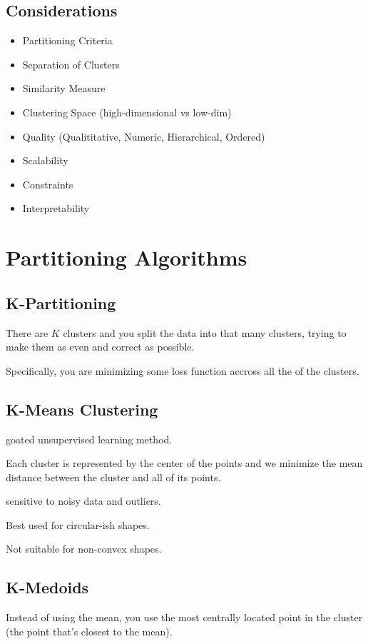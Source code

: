 \documentclass[fleqn]{report}
\begin{document}
\subsection{Considerations}
\begin{itemize}
    \item 
    Partitioning Criteria 
    \item 
    Separation of Clusters 
    \item 
    Similarity Measure 
    \item 
    Clustering Space (high-dimensional vs low-dim) 
    \item 
    Quality (Qualititative, Numeric, Hierarchical, Ordered)
    \item 
    Scalability 
    \item 
    Constraints 
    \item 
    Interpretability
\end{itemize}

\section{Partitioning Algorithms}
\subsection{K-Partitioning}
There are $K$ clusters and you split the data into that many clusters, trying 
to make them as even and correct as possible.

Specifically, you are minimizing some loss function accross 
all the of the clusters.

\subsection{K-Means Clustering}
goated unsupervised learning method.

Each cluster is represented by the center of the points 
and we minimize the mean distance between the cluster and all 
of its points.

sensitive to noisy data and outliers. 

Best used for circular-ish shapes.

Not suitable for non-convex shapes.

\subsection{K-Medoids}
Instead of using the mean, you use the most centrally 
located point in the cluster (the point that's closest 
to the mean).
\end{document}
